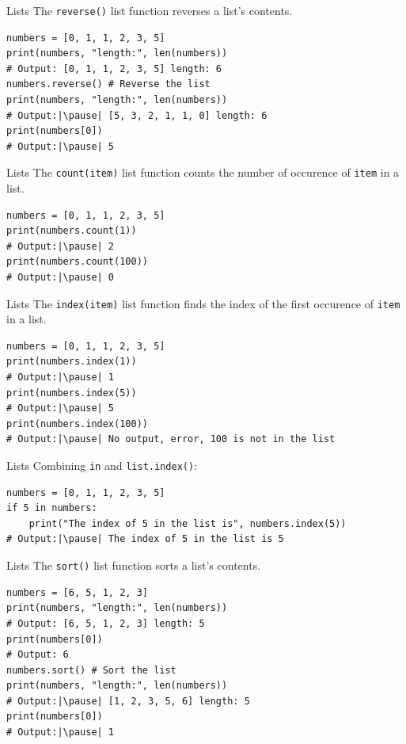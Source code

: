 \documentclass[dvipsnames, svgnames, x11names, handout]{beamer}
\begin{document}
\begin{frame}[fragile]{Lists}
The \texttt{reverse()} list function reverses a list's contents. \pause

\begin{verbatim}
numbers = [0, 1, 1, 2, 3, 5]
print(numbers, "length:", len(numbers)) 
# Output: [0, 1, 1, 2, 3, 5] length: 6
numbers.reverse() # Reverse the list
print(numbers, "length:", len(numbers)) 
# Output:|\pause| [5, 3, 2, 1, 1, 0] length: 6
print(numbers[0])
# Output:|\pause| 5
\end{verbatim}
\end{frame}

\begin{frame}[fragile]{Lists}
The \texttt{count(item)} list function counts the number of occurence of \texttt{item} in a list. \pause

\begin{verbatim}
numbers = [0, 1, 1, 2, 3, 5]
print(numbers.count(1)) 
# Output:|\pause| 2
print(numbers.count(100)) 
# Output:|\pause| 0
\end{verbatim}
\end{frame}

\begin{frame}[fragile]{Lists}
The \texttt{index(item)} list function finds the index of the first occurence of \texttt{item} in a list. \pause

\begin{verbatim}
numbers = [0, 1, 1, 2, 3, 5]
print(numbers.index(1)) 
# Output:|\pause| 1
print(numbers.index(5)) 
# Output:|\pause| 5
print(numbers.index(100))
# Output:|\pause| No output, error, 100 is not in the list
\end{verbatim}
\end{frame}

\begin{frame}[fragile]{Lists}
Combining \texttt{in} and \texttt{list.index()}: \pause

\begin{verbatim}
numbers = [0, 1, 1, 2, 3, 5]
if 5 in numbers:
    print("The index of 5 in the list is", numbers.index(5))
# Output:|\pause| The index of 5 in the list is 5
\end{verbatim}
\end{frame}

\begin{frame}[fragile]{Lists}
The \texttt{sort()} list function sorts a list's contents. \pause

\begin{verbatim}
numbers = [6, 5, 1, 2, 3]
print(numbers, "length:", len(numbers)) 
# Output: [6, 5, 1, 2, 3] length: 5
print(numbers[0])
# Output: 6
numbers.sort() # Sort the list
print(numbers, "length:", len(numbers)) 
# Output:|\pause| [1, 2, 3, 5, 6] length: 5
print(numbers[0])
# Output:|\pause| 1
\end{verbatim}
\end{frame}
\end{document}
